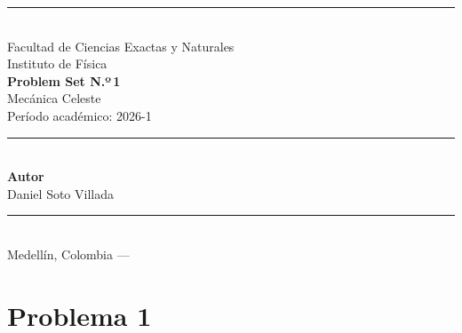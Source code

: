 \documentclass[12pt, letterpaper]{article}
\newcommand{\curso}{Mecánica Celeste}
\newcommand{\tarea}{Problem Set N.º\,1}
\newcommand{\periodo}{2026-1}
\newcommand{\autor}{Daniel Soto Villada}
\newcommand{\institucion}{Universidad de Antioquia}
\newcommand{\facultad}{Facultad de Ciencias Exactas y Naturales}
\newcommand{\departamento}{Instituto de Física}
\begin{document}
\thispagestyle{empty}

\begin{titlepage}
    \centering


    {\color{udea}\rule{\linewidth}{1.5pt}}\\[0.4cm]

    {\normalsize \facultad}\\[0.05cm]
    {\normalsize \departamento}\\[0.6cm]

    {\LARGE\bfseries \tarea}\\[0.3cm]
    {\Large \curso}\\[0.2cm]
    {\normalsize Período académico: \periodo}\\[0.5cm]

    {\color{udea}\rule{\linewidth}{0.8pt}}\\[0.8cm]

    {\small\bfseries Autor}\\[0.4cm]
    {\small \autor}

    \vfill

    {\color{udea}\rule{\linewidth}{1.5pt}}\\[0.2cm]
    {\footnotesize Medellín, Colombia — \the\year}

\end{titlepage}

\newpage
\thispagestyle{empty}           %
{
    \hypersetup{linkcolor=black} %
    \tableofcontents
}
\newpage                        %



\section{Problema 1}
\end{document}
